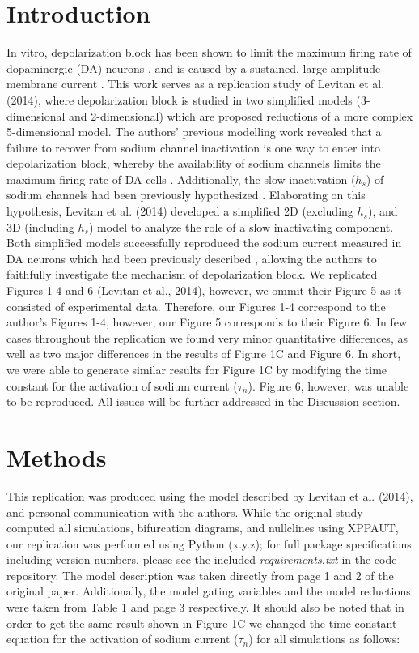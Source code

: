\section{Introduction}

In vitro, depolarization block has been shown to limit the maximum firing rate of dopaminergic (DA) neurons \supercite{Richards1997}, and is caused by a sustained, large amplitude membrane current \supercite{Bianchi2012}. This work serves as a replication study of Levitan et al. (2014), where depolarization block is studied in two simplified models (3-dimensional and 2-dimensional) which are proposed reductions of a more complex 5-dimensional model. The authors’ previous modelling work revealed that a failure to recover from sodium channel inactivation is one way to enter into depolarization block, whereby the availability of sodium channels limits the maximum firing rate of DA cells \supercite{Levitan2014}. Additionally, the slow inactivation ($h_{s}$) of sodium channels had been previously hypothesized \supercite{Ding2011}. Elaborating on this hypothesis, Levitan et al. (2014) developed a simplified 2D (excluding $h_{s}$), and 3D (including $h_{s}$) model to analyze the role of a slow inactivating component. Both simplified models successfully reproduced the sodium current measured in DA neurons which had been previously described \supercite{Seutin2010}, allowing the authors to faithfully investigate the mechanism of depolarization block. We replicated Figures 1-4 and 6 (Levitan et al., 2014), however, we ommit their Figure 5 as it consisted of experimental data. Therefore, our Figures 1-4 correspond to the author's Figures 1-4, however, our Figure 5 corresponds to their Figure 6. In few cases throughout the replication we found very minor quantitative differences, as well as two major differences in the results of Figure 1C and Figure 6. In short, we were able to generate similar results for Figure 1C by modifying the time constant for the activation of sodium current ($\tau_{n}$). Figure 6, however, was unable to be reproduced. All issues will be further addressed in the Discussion section. 

\section{Methods}

This replication was produced using the model described by Levitan et al. (2014), and personal communication with the authors. While the original study computed all simulations, bifurcation diagrams, and nullclines using XPPAUT, our replication was performed using Python (x.y.z); for full package specifications including version numbers, please see the included \emph{requirements.txt} in the code repository. The model description was taken directly from page 1 and 2 of the original paper. Additionally, the model gating variables and the model reductions were taken from Table 1 and page 3 respectively. It should also be noted that in order to get the same result shown in Figure 1C we changed the time constant equation for the activation of sodium current ($\tau_{n}$) for all simulations as follows: 
 
